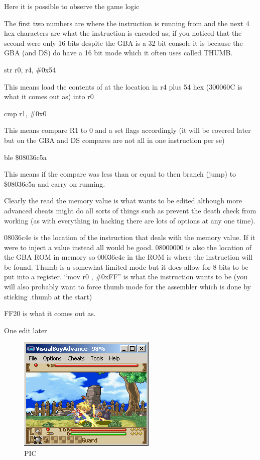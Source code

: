 \documentclass[
]{book}
\begin{document}
Here it is possible to observe the game logic

The first two numbers are where the instruction is running from and the next 4 hex characters are what the instruction is encoded as; if you noticed that the second were only 16 bits despite the GBA is a 32 bit console it is because the GBA (and DS) do have a 16 bit mode which it often uses called THUMB.

str r0, r4, \#0x54

This means load the contents of at the location in r4 plus 54 hex (300060C is what it comes out as) into r0

cmp r1, \#0x0

This means compare R1 to 0 and a set flags accordingly (it will be covered later but on the GBA and DS compares are not all in one instruction per se)

ble \$08036c5a

This means if the compare was less than or equal to then branch (jump) to \$08036c5a and carry on running.

Clearly the read the memory value is what wants to be edited although more advanced cheats might do all sorts of things such as prevent the death check from working (as with everything in hacking there are lots of options at any one time).

08036c4e is the location of the instruction that deals with the memory value. If it were to inject a value instead all would be good. 08000000 is also the location of the GBA ROM in memory so 00036c4e in the ROM is where the instruction will be found. Thumb is a somewhat limited mode but it does allow for 8 bits to be put into a register. ``mov r0 , \#0xFF'' is what the instruction wants to be (you will also probably want to force thumb mode for the assembler which is done by sticking .thumb at the start)

FF20 is what it comes out as.

One edit later

\begin{figure}
\centering
\includegraphics{images/213_home_fast6191_romhackingguide_unrenamed_fil___orders_romhackingguidecheatasminstruction_4.png}
\caption{PIC}
\end{figure}
\end{document}

